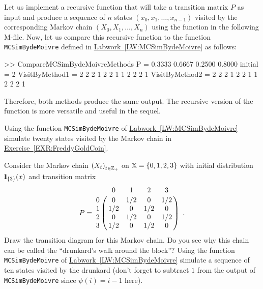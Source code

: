 \begin{labwork}\label{LW:MCSimBydeMoivreRecurse}
Let us implement a recursive function that will take a transition matrix $P$ as input and produce a sequence of $n$ states $(x_0,x_1,\ldots,x_{n-1})$ visited by the corresponding Markov chain $(X_0,X_1,\ldots, X_n)$ using the function in the following M-file.
Now, let us compare this recursive function to the function {\tt MCSimBydeMoivre} defined in \hyperref[LW:MCSimBydeMoivre]{Labwork~\ref*{LW:MCSimBydeMoivre}} as follows:
\begin{VrbM}
>> CompareMCSimBydeMoivreMethods
P =
    0.3333    0.6667
    0.2500    0.8000
initial =
     2
VisitByMethod1 =
     2     2     2     1     2     2     1     1     2     2     2     1
VisitByMethod2 =
     2     2     2     1     2     2     1     1     2     2     2     1
\end{VrbM}
Therefore, both methods produce the same output.  The recursive version of the function is more versatile and useful in the sequel.
\end{labwork}

\begin{simulation}\label{SIM:FreddyGoldCoinRMR}
Using the function {\tt MCSimBydeMoivre} of \hyperref[LW:MCSimBydeMoivre]{Labwork~\ref*{LW:MCSimBydeMoivre}} simulate twenty states visited by the Markov chain in \hyperref[EXR:FreddyGoldCoin]{Exercise~\ref*{EXR:FreddyGoldCoin}}.
\end{simulation}

\begin{simulation}\label{SIM:DrunkardsWalkBlock}
Consider the Markov chain $\left(X_t\right)_{t \in \mathbb{Z}_+}$ on $\mathbb{X}=\{0,1,2,3\}$ with initial distribution ${1}\mspace{-11 mu}{1}_{\{3\}}(x)$ and transition matrix 
$$P = 
\bordermatrix{~ & 0 & 1 & 2 & 3 \cr 
0 & 0 & 1/2 & 0 & 1/2\cr
1 & 1/2 & 0 & 1/2 & 0\cr
2 & 0 & 1/2 & 0 & 1/2\cr
3 & 1/2 & 0 & 1/2 & 0 } \enspace .
$$
Draw the transition diagram for this Markov chain.  Do you see why this chain can be called the ``drunkard's walk around the block''? Using the function {\tt MCSimBydeMoivre} of \hyperref[LW:MCSimBydeMoivre]{Labwork~\ref*{LW:MCSimBydeMoivre}} simulate a sequence of ten states visited by the drunkard (don't forget to subtract $1$ from the output of {\tt MCSimBydeMoivre} since $\psi(i)=i-1$ here). 
\end{simulation}

